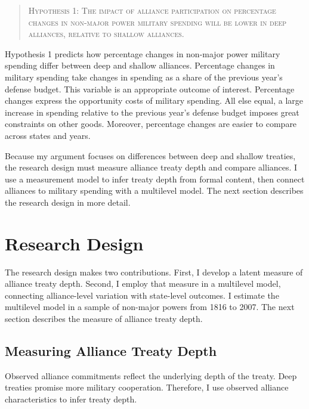 \documentclass[12pt]{article}
\begin{document}
\begin{quote}
\textsc{Hypothesis 1: The impact of alliance participation on percentage changes in non-major power military spending will be lower in deep alliances, relative to shallow alliances.}
\end{quote}


Hypothesis 1 predicts how percentage changes in non-major power military spending differ between deep and shallow alliances. 
Percentage changes in military spending take changes in spending as a share of the previous year's defense budget.
This variable is an appropriate outcome of interest. 
Percentage changes express the opportunity costs of military spending. 
All else equal, a large increase in spending relative to the previous year's defense budget imposes great constraints on other goods. 
Moreover, percentage changes are easier to compare across states and years. 


Because my argument focuses on differences between deep and shallow treaties, the research design must measure alliance treaty depth and compare alliances.  
I use a measurement model to infer treaty depth from formal content, then connect alliances to military spending with a multilevel model. 
The next section describes the research design in more detail. 



\section{Research Design} 


The research design makes two contributions. 
First, I develop a latent measure of alliance treaty depth. 
Second, I employ that measure in a multilevel model, connecting alliance-level variation with state-level outcomes. 
I estimate the multilevel model in a sample of non-major powers from 1816 to 2007. 
The next section describes the measure of alliance treaty depth. 


\subsection{Measuring Alliance Treaty Depth} 


Observed alliance commitments reflect the underlying depth of the treaty. 
Deep treaties promise more military cooperation. 
Therefore, I use observed alliance characteristics to infer treaty depth.
\end{document}
